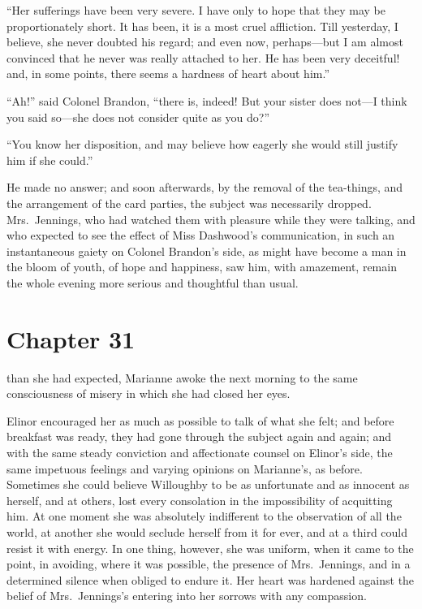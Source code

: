 ``Her sufferings have been very severe.  I have
only to hope that they may be proportionately short.
It has been, it is a most cruel affliction.  Till yesterday,
I believe, she never doubted his regard; and even now,
perhaps---but I am almost convinced that he never was
really attached to her.  He has been very deceitful! and,
in some points, there seems a hardness of heart about him.''

``Ah!'' said Colonel Brandon, ``there is, indeed!  But
your sister does not---I think you said so---she does
not consider quite as you do?''

``You know her disposition, and may believe how eagerly
she would still justify him if she could.''

He made no answer; and soon afterwards, by the removal
of the tea-things, and the arrangement of the card parties,
the subject was necessarily dropped.  Mrs.\ Jennings, who had
watched them with pleasure while they were talking, and who
expected to see the effect of Miss Dashwood's communication,
in such an instantaneous gaiety on Colonel Brandon's side,
as might have become a man in the bloom of youth, of hope
and happiness, saw him, with amazement, remain the whole
evening more serious and thoughtful than usual.



\chapter{Chapter 31}


 than she had expected,
Marianne awoke the next morning to the same consciousness
of misery in which she had closed her eyes.

Elinor encouraged her as much as possible to talk
of what she felt; and before breakfast was ready, they had
gone through the subject again and again; and with the same
steady conviction and affectionate counsel on Elinor's side,
the same impetuous feelings and varying opinions on
Marianne's, as before.  Sometimes she could believe
Willoughby to be as unfortunate and as innocent as herself,
and at others, lost every consolation in the impossibility
of acquitting him.  At one moment she was absolutely
indifferent to the observation of all the world, at another
she would seclude herself from it for ever, and at a third
could resist it with energy.  In one thing, however,
she was uniform, when it came to the point, in avoiding,
where it was possible, the presence of Mrs.\ Jennings,
and in a determined silence when obliged to endure it.
Her heart was hardened against the belief of Mrs.\ Jennings's
entering into her sorrows with any compassion.

